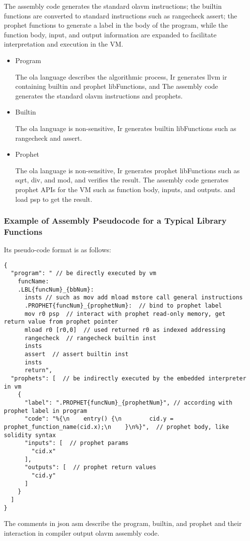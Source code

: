     The assembly code generates the standard olavm instructions; the builtin functions are converted to standard instructions such as rangecheck assert;
the prophet functions to generate a label in the body of the program, while the function body, input, and output information are expanded to facilitate interpretation and execution in the VM.
\begin{itemize}
    \item Program

    The ola language describes the algorithmic process, Ir generates llvm ir containing builtin and prophet libFunctions, and The assembly code generates the standard olavm instructions and prophets.
    \item Builtin

    The ola language is non-sensitive, Ir generates builtin libFunctions such as rangecheck and assert.
    \item Prophet

    The ola language is non-sensitive, Ir generates prophet libFunctions such as sqrt, div, and mod, and verifies the result.
The assembly code generates prophet APIs for the VM such as function body, inputs, and outputs. and load psp to get the result.
\end{itemize}

\subsubsection*{Example of Assembly Pseudocode for a Typical Library Functions}

Its pseudo-code format is as follows:
\begin{lstlisting}[language={}]
{
  "program": " // be directly executed by vm
    funcName:
    .LBL{funcNum}_{bbNum}:
      insts // such as mov add mload mstore call general instructions
      .PROPHET{funcNum}_{prophetNum}:  // bind to prophet label
      mov r0 psp  // interact with prophet read-only memory, get return value from prophet pointer
      mload r0 [r0,0]  // used returned r0 as indexed addressing
      rangecheck  // rangecheck builtin inst
      insts
      assert  // assert builtin inst
      insts
      return",
  "prophets": [  // be indirectly executed by the embedded interpreter in vm
    {
      "label": ".PROPHET{funcNum}_{prophetNum}", // according with prophet label in program
      "code": "%{\n    entry() {\n        cid.y = prophet_function_name(cid.x);\n    }\n%}",  // prophet body, like solidity syntax
      "inputs": [  // prophet params
        "cid.x"
      ],
      "outputs": [  // prophet return values
        "cid.y"
      ]
    }
  ]
}
\end{lstlisting}
The comments in json asm describe the program, builtin, and prophet and their interaction in compiler output olavm assembly code.

